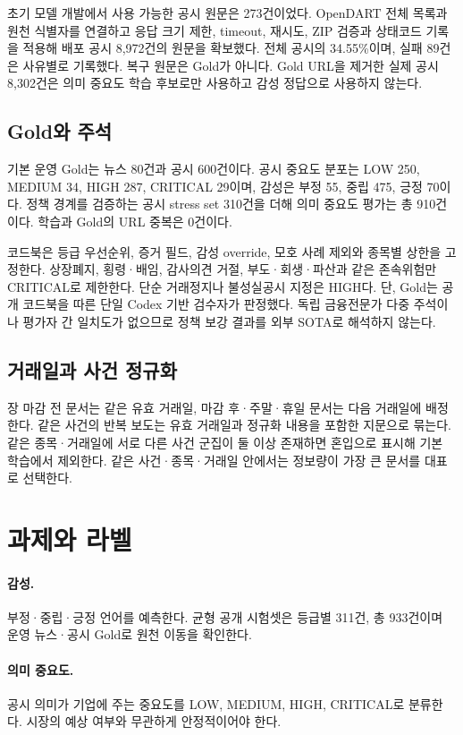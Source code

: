 \documentclass[10pt,a4paper,twocolumn]{article}
\begin{document}
초기 모델 개발에서 사용 가능한 공시 원문은 273건이었다. OpenDART 전체 목록과 원천 식별자를 연결하고 응답 크기 제한, timeout, 재시도, ZIP 검증과 상태코드 기록을 적용해 배포 공시 8,972건의 원문을 확보했다. 전체 공시의 34.55\%이며, 실패 89건은 사유별로 기록했다. 복구 원문은 Gold가 아니다. Gold URL을 제거한 실제 공시 8,302건은 의미 중요도 학습 후보로만 사용하고 감성 정답으로 사용하지 않는다.

\subsection{Gold와 주석}

기본 운영 Gold는 뉴스 80건과 공시 600건이다. 공시 중요도 분포는 LOW 250, MEDIUM 34, HIGH 287, CRITICAL 29이며, 감성은 부정 55, 중립 475, 긍정 70이다. 정책 경계를 검증하는 공시 stress set 310건을 더해 의미 중요도 평가는 총 910건이다. 학습과 Gold의 URL 중복은 0건이다.

코드북은 등급 우선순위, 증거 필드, 감성 override, 모호 사례 제외와 종목별 상한을 고정한다. 상장폐지, 횡령·배임, 감사의견 거절, 부도·회생·파산과 같은 존속위험만 CRITICAL로 제한한다. 단순 거래정지나 불성실공시 지정은 HIGH다. 단, Gold는 공개 코드북을 따른 단일 Codex 기반 검수자가 판정했다. 독립 금융전문가 다중 주석이나 평가자 간 일치도가 없으므로 정책 보강 결과를 외부 SOTA로 해석하지 않는다.

\subsection{거래일과 사건 정규화}

장 마감 전 문서는 같은 유효 거래일, 마감 후·주말·휴일 문서는 다음 거래일에 배정한다. 같은 사건의 반복 보도는 유효 거래일과 정규화 내용을 포함한 지문으로 묶는다. 같은 종목·거래일에 서로 다른 사건 군집이 둘 이상 존재하면 혼입으로 표시해 기본 학습에서 제외한다. 같은 사건·종목·거래일 안에서는 정보량이 가장 큰 문서를 대표로 선택한다.

\section{과제와 라벨}

\paragraph{감성.} 부정·중립·긍정 언어를 예측한다. 균형 공개 시험셋은 등급별 311건, 총 933건이며 운영 뉴스·공시 Gold로 원천 이동을 확인한다.

\paragraph{의미 중요도.} 공시 의미가 기업에 주는 중요도를 LOW, MEDIUM, HIGH, CRITICAL로 분류한다. 시장의 예상 여부와 무관하게 안정적이어야 한다.
\end{document}
